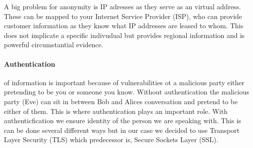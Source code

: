 A big problem for anonymity is IP adresses as they serve as an virtual
address. These can be mapped to your Internet Service Provider (ISP),
who can provide customer information as they know what IP addresses
are leased to whom. This does not implicate a specific indivudual but
provides regional information and is powerful circumstantial
evidence.



\paragraph{Authentication}of information is important because of
vulnerabilities ot a malicious party either pretending to be you or
someone you know. Without authentication the malicious party (Eve) can
sit in between Bob and Alices conversation and pretend to be either of
them. This is where authentication plays an important role. With
authenticfication we ensure identity of the person we are speaking
with. This is can be done several different ways but in our case we
decided to use Transport Layer Security (TLS) which predecessor is,
Secure Sockets Layer (SSL).

